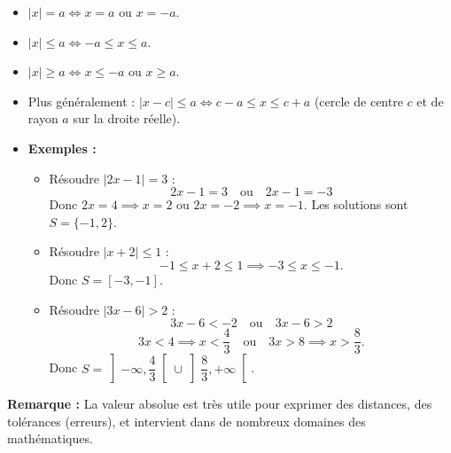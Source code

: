 \documentclass[12pt,a4paper]{article}
\newcounter{solution}
\begin{document}
\begin{itemize}
    \item $|x| = a \iff x = a \text{ ou } x = -a$.
    \item $|x| \leq a \iff -a \leq x \leq a$.
    \item $|x| \geq a \iff x \leq -a \text{ ou } x \geq a$.
    \item Plus généralement : $|x - c| \leq a \iff c - a \leq x \leq c + a$ (cercle de centre $c$ et de rayon $a$ sur la droite réelle).
\end{itemize}

\begin{itemize}
    \item \textbf{Exemples :}
    \begin{itemize}
        \item Résoudre $|2x-1| = 3$ :
        \[
        2x-1 = 3 \quad \text{ou} \quad 2x-1 = -3
        \]
        Donc $2x = 4 \implies x=2$ ou $2x = -2 \implies x=-1$. Les solutions sont $S = \{-1, 2\}$.
        \item Résoudre $|x+2| \leq 1$ :
        \[
        -1 \leq x+2 \leq 1 \implies -3 \leq x \leq -1.
        \]
        Donc $S = [-3, -1]$.
        \item Résoudre $|3x-6| > 2$ :
        \[
        3x-6 < -2 \quad \text{ou} \quad 3x-6 > 2
        \]
        \[
        3x < 4 \implies x < \frac{4}{3} \quad \text{ou} \quad 3x > 8 \implies x > \frac{8}{3}.
        \]
        Donc $S = \left]-\infty, \dfrac{4}{3}\right[ \cup \left]\dfrac{8}{3}, +\infty\right[$.
    \end{itemize}
\end{itemize}

\vspace{0.5em}
\noindent \textbf{Remarque :} La valeur absolue est très utile pour exprimer des distances, des tolérances (erreurs), et intervient dans de nombreux domaines des mathématiques.
\end{document}
